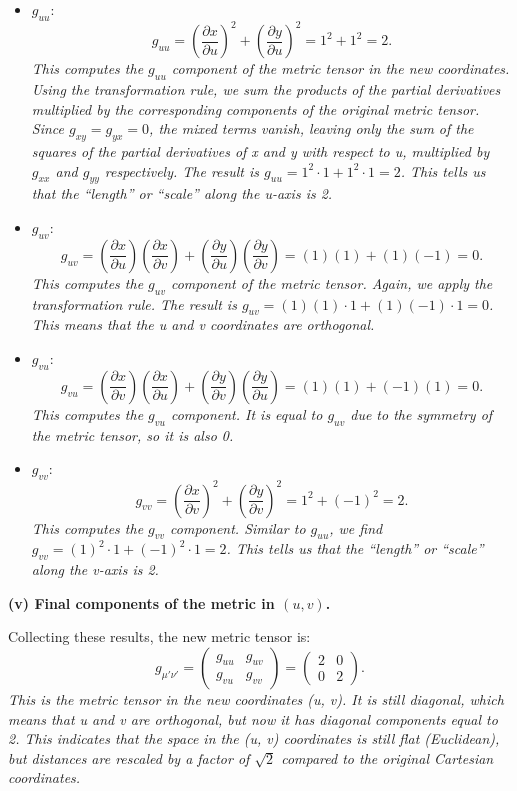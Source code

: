 \begin{itemize}
\item \(\displaystyle g_{uu}\):
\[
g_{uu}
=
\left(\frac{\partial x}{\partial u}\right)^2
+
\left(\frac{\partial y}{\partial u}\right)^2
=
1^2 + 1^2
=
2.
\]
\emph{This computes the \(g_{uu}\) component of the metric tensor in the new coordinates. Using the transformation rule, we sum the products of the partial derivatives multiplied by the corresponding components of the original metric tensor. Since \(g_{xy} = g_{yx} = 0\), the mixed terms vanish, leaving only the sum of the squares of the partial derivatives of x and y with respect to u, multiplied by \(g_{xx}\) and \(g_{yy}\) respectively. The result is \(g_{uu} = 1^2 \cdot 1 + 1^2 \cdot 1 = 2\). This tells us that the “length” or “scale” along the u-axis is 2.}

\item \(\displaystyle g_{uv}\):
\[
g_{uv}
=
\left(\frac{\partial x}{\partial u}\right)\left(\frac{\partial x}{\partial v}\right)
+
\left(\frac{\partial y}{\partial u}\right)\left(\frac{\partial y}{\partial v}\right)
=
(1)(1) + (1)(-1)
=
0.
\]
\emph{This computes the \(g_{uv}\) component of the metric tensor. Again, we apply the transformation rule. The result is \(g_{uv} = (1)(1) \cdot 1 + (1)(-1) \cdot 1 = 0\). This means that the u and v coordinates are orthogonal.}

\item \(\displaystyle g_{vu}\):
\[
g_{vu}
=
\left(\frac{\partial x}{\partial v}\right)\left(\frac{\partial x}{\partial u}\right)
+
\left(\frac{\partial y}{\partial v}\right)\left(\frac{\partial y}{\partial u}\right)
=
(1)(1) + (-1)(1)
=
0.
\]
\emph{This computes the \(g_{vu}\) component. It is equal to \(g_{uv}\) due to the symmetry of the metric tensor, so it is also 0.}

\item \(\displaystyle g_{vv}\):
\[
g_{vv}
=
\left(\frac{\partial x}{\partial v}\right)^2
+
\left(\frac{\partial y}{\partial v}\right)^2
=
1^2 + (-1)^2
=
2.
\]
\emph{This computes the \(g_{vv}\) component. Similar to \(g_{uu}\), we find \(g_{vv} = (1)^2 \cdot 1 + (-1)^2 \cdot 1 = 2\). This tells us that the “length” or “scale” along the v-axis is 2.}
\end{itemize}

\textbf{(v) Final components of the metric in \((u,v)\).}

Collecting these results, the new metric tensor is:
\[
g_{\mu' \nu'}
=
\begin{pmatrix}
g_{uu} & g_{uv} \\
g_{vu} & g_{vv}
\end{pmatrix}
=
\begin{pmatrix}
2 & 0 \\
0 & 2
\end{pmatrix}.
\]
\emph{This is the metric tensor in the new coordinates (u, v). It is still diagonal, which means that u and v are orthogonal, but now it has diagonal components equal to 2. This indicates that the space in the (u, v) coordinates is still flat (Euclidean), but distances are rescaled by a factor of \(\sqrt{2}\) compared to the original Cartesian coordinates.}

